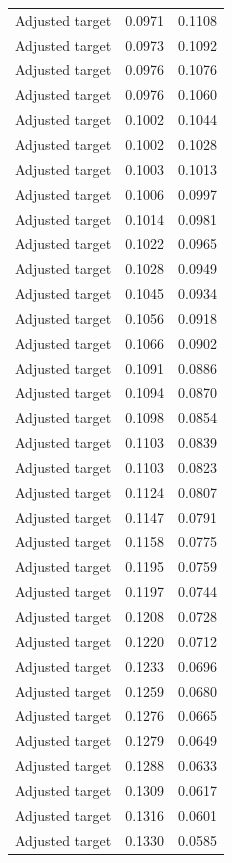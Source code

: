 \begin{table}[htbp]
\begin{tabular}{lll}
Adjusted target & 0.0971 & 0.1108 \\
Adjusted target & 0.0973 & 0.1092 \\
Adjusted target & 0.0976 & 0.1076 \\
Adjusted target & 0.0976 & 0.1060 \\
Adjusted target & 0.1002 & 0.1044 \\
Adjusted target & 0.1002 & 0.1028 \\
Adjusted target & 0.1003 & 0.1013 \\
Adjusted target & 0.1006 & 0.0997 \\
Adjusted target & 0.1014 & 0.0981 \\
Adjusted target & 0.1022 & 0.0965 \\
Adjusted target & 0.1028 & 0.0949 \\
Adjusted target & 0.1045 & 0.0934 \\
Adjusted target & 0.1056 & 0.0918 \\
Adjusted target & 0.1066 & 0.0902 \\
Adjusted target & 0.1091 & 0.0886 \\
Adjusted target & 0.1094 & 0.0870 \\
Adjusted target & 0.1098 & 0.0854 \\
Adjusted target & 0.1103 & 0.0839 \\
Adjusted target & 0.1103 & 0.0823 \\
Adjusted target & 0.1124 & 0.0807 \\
Adjusted target & 0.1147 & 0.0791 \\
Adjusted target & 0.1158 & 0.0775 \\
Adjusted target & 0.1195 & 0.0759 \\
Adjusted target & 0.1197 & 0.0744 \\
Adjusted target & 0.1208 & 0.0728 \\
Adjusted target & 0.1220 & 0.0712 \\
Adjusted target & 0.1233 & 0.0696 \\
Adjusted target & 0.1259 & 0.0680 \\
Adjusted target & 0.1276 & 0.0665 \\
Adjusted target & 0.1279 & 0.0649 \\
Adjusted target & 0.1288 & 0.0633 \\
Adjusted target & 0.1309 & 0.0617 \\
Adjusted target & 0.1316 & 0.0601 \\
Adjusted target & 0.1330 & 0.0585 \\

\end{tabular}
\end{table}
